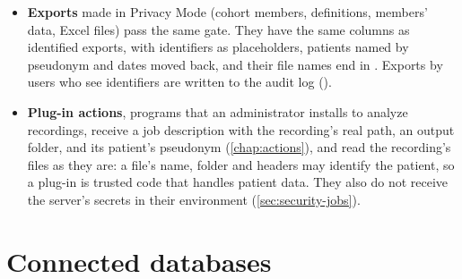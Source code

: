 \begin{itemize}
\item \textbf{Exports} made in Privacy Mode (cohort members, definitions, members' data, Excel
  files) pass the same gate. They have the same columns as identified
  exports, with identifiers as placeholders, patients named by pseudonym and dates moved back,
  and their file names end in . Exports by users who see identifiers are written
  to the audit log ().
\item \textbf{Plug-in actions}, programs that an administrator installs to analyze recordings,
  receive a job description with the recording's real path, an output folder, and
  its patient's pseudonym (\cref{chap:actions}), and read the recording's files as they are: a
  file's name, folder and headers may identify the patient, so a plug-in is trusted code that
  handles patient data.
  They also do not receive the server's secrets in their environment
  (\cref{sec:security-jobs}).
\end{itemize}

\section{Connected databases}
\label{sec:protecting-connected}

